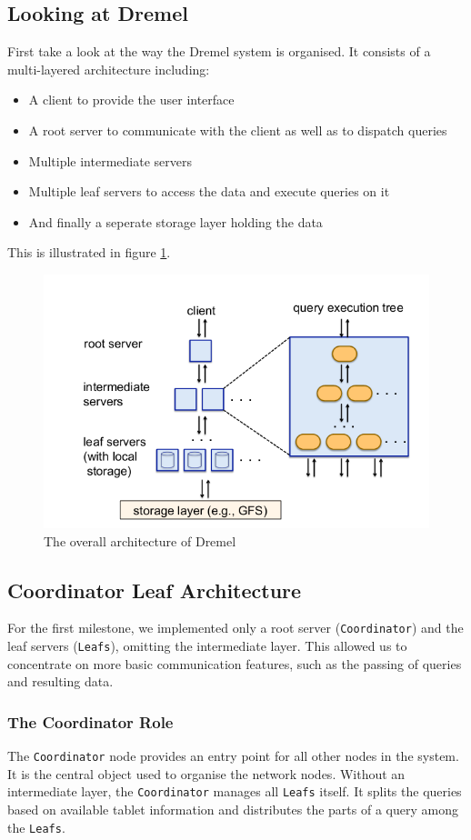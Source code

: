   \subsection{Looking at Dremel}
    First take a look at the way the Dremel \cite{melnik2010dremel} system is
    organised.
    It consists of a multi-layered architecture including:
    \begin{itemize}
      \item A client to provide the user interface
      \item A root server to communicate with the client as well as to dispatch
        queries
      \item Multiple intermediate servers
      \item Multiple leaf servers to access the data and execute queries on it
      \item And finally a seperate storage layer holding the data
    \end{itemize}
    This is illustrated in figure \ref{netarch}.
    \begin{figure}[ht]
      \centering
      \includegraphics[width=.7\textwidth]{images/net-arch}
      \caption{The overall architecture of Dremel\cite{melnik2010dremel}}
      \label{netarch}
    \end{figure}


  \subsection{Coordinator Leaf Architecture}
    For the first milestone, we implemented only a root server
    (\texttt{Coordinator}) and the leaf servers (\texttt{Leafs}),
    omitting the intermediate layer.
    This allowed us to concentrate on more basic communication features,
    such as the passing of queries and resulting data.
    \subsubsection{The Coordinator Role}
      The \texttt{Coordinator} node provides an entry point for all other nodes
      in the system.
      It is the central object used to organise the network nodes.
      Without an intermediate layer, the \texttt{Coordinator} manages all
      \texttt{Leafs} itself. It splits the queries based on available tablet
      information and distributes the parts of a query among the \texttt{Leafs}.
    
